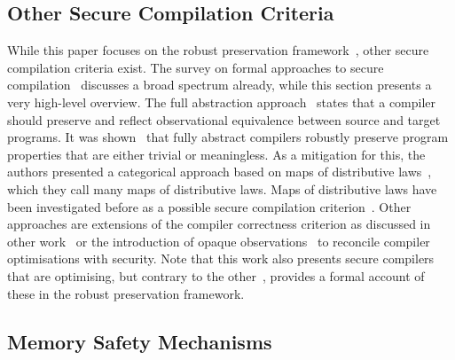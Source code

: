 \documentclass[utf8,acmsmall,review,screen,dvipsnames,anonymous]{acmart}
\begin{document}
\subsection{Other Secure Compilation Criteria}\label{subsec:relw:seccompcrit}

While this paper focuses on the robust preservation framework~\cite{abate2019jour}, other secure compilation criteria exist.
The survey on formal approaches to secure compilation~\cite{patrignani2019survey} discusses a broad spectrum already, while this section presents a very high-level overview.
The full abstraction approach~\cite{abadi1999fullabstraction} states that a compiler should preserve and reflect observational equivalence between source and target programs.
It was shown~\cite{abate2021faandrc} that fully abstract compilers robustly preserve program properties that are either trivial or meaningless.
As a mitigation for this, the authors presented a categorical approach based on maps of distributive laws~\cite{watanabe2002modl}, which they call many maps of distributive laws.
Maps of distributive laws have been investigated before as a possible secure compilation criterion~\cite{tsampas2020catsc}.
Other approaches are extensions of the compiler correctness criterion as discussed in other work~\cite{patterson2019next700} or the introduction of opaque observations~\cite{vu2021reconciling} to reconcile compiler optimisations with security.
Note that this work also presents secure compilers that are optimising, but contrary to the other~\cite{vu2021reconciling}, provides a formal account of these in the robust preservation framework.

\subsection{Memory Safety Mechanisms}\label{subsec:relw:msmechs}
\end{document}
